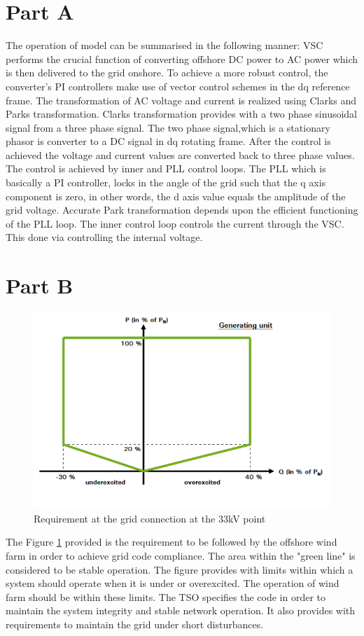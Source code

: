 \justifying



\section*{\textbf{Part A}}
The operation of model can be summarised in the following manner:\newline
VSC performs the crucial function of converting offshore DC power to AC power which is then delivered to the grid onshore. To achieve a more robust control, the converter's PI controllers make use of vector control schemes in the dq reference frame. The transformation of AC voltage and current is realized using Clarks and Parks transformation. Clarks transformation provides with a two phase  sinusoidal signal from a three phase signal. The two phase signal,which is a stationary phasor is converter to a DC signal in dq rotating frame. After the control is achieved the voltage and current values are converted back to three phase values.  The control is achieved by inner and PLL control loops. The PLL which is basically a PI controller, locks in the angle of the grid such that the q axis component is zero, in other words, the d axis value equals the amplitude of the grid voltage. Accurate Park transformation depends upon the efficient functioning of the PLL loop. The inner control loop controls the current through the VSC. This done via controlling the internal voltage. \newline

\section*{\textbf{Part B}}
\begin{figure}[H]
    \centering
        \includegraphics[width=0.8 \linewidth]{images_a7/gridcode.png}
        \caption{Requirement at the grid connection at the 33kV point}
        \label{fig:gridcode}   
\end{figure}
The Figure \ref{fig:gridcode} provided is the requirement to be followed by the offshore wind farm in order to achieve grid code compliance. The area within the "green line" is considered to be stable operation. The figure provides with limits within which a system should operate when it is under or overexcited. The operation of wind farm should be within these limits. The TSO specifies the code in order to maintain the system integrity and stable network operation. It also provides with requirements to maintain the grid under short disturbances.

